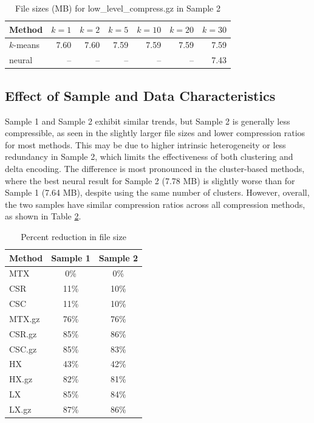 \documentclass[unnumsec,webpdf,contemporary,large]{oup-authoring-template}
\begin{document}
\begin{table}[h!]
\centering
\caption{File sizes (MB) for low\_level\_compress.gz in Sample 2}
\begin{tabular}{lrrrrrr}
\hline
Method & $k=1$ & $k=2$ & $k=5$ & $k=10$ & $k=20$ & $k=30$ \\
\hline
$k$-means & 7.60 & 7.60 & 7.59 & 7.59 & 7.59 & 7.59 \\
neural & -- & -- & -- & -- & -- & 7.43 \\
\hline
\end{tabular}
\label{tab:Sample 2_sizes}
\end{table}

\subsection{Effect of Sample and Data Characteristics}
Sample 1 and Sample 2 exhibit similar trends, but Sample 2 is generally less compressible, as seen in the slightly larger file sizes and lower compression ratios for most methods. This may be due to higher intrinsic heterogeneity or less redundancy in Sample 2, which limits the effectiveness of both clustering and delta encoding. The difference is most pronounced in the cluster-based methods, where the best neural result for Sample 2 (7.78 MB) is slightly worse than for Sample 1 (7.64 MB), despite using the same number of clusters. However, overall, the two samples have similar compression ratios across all compression methods, as shown in Table \ref{tab:compression_ratios}.


\begin{table}[h!]
\centering
\caption{Percent reduction in file size}
\begin{tabular}{lcc}
\hline
Method & Sample 1 & Sample 2 \\
\hline
MTX & 0\% & 0\% \\
CSR & 11\% & 10\% \\
CSC & 11\% & 10\% \\
MTX.gz & 76\% & 76\% \\
CSR.gz & 85\% & 86\% \\
CSC.gz & 85\% & 83\% \\
HX & 43\% & 42\% \\
HX.gz & 82\% & 81\% \\
LX & 85\% & 84\% \\
LX.gz & 87\% & 86\% \\
\hline
\end{tabular}
\label{tab:compression_ratios}
\end{table}
\end{document}
